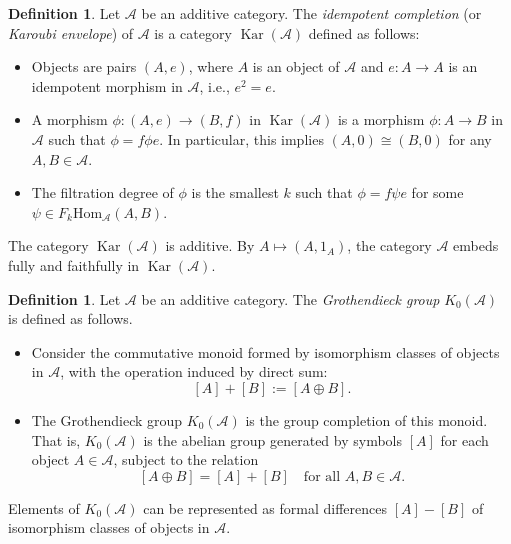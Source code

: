 \documentclass{article}
\theoremstyle{definition}
\newtheorem{defn}[theorem]{Definition}
\newcommand{\Hom}{\mathrm{Hom}}
\newcommand{\CA}{{ \mathcal A}}
\begin{document}
\begin{defn}
    Let $\mathcal{A}$ be an additive category. The \emph{idempotent completion} (or \emph{Karoubi envelope}) of $\mathcal{A}$ is a category $\operatorname{Kar}(\mathcal{A})$ defined as follows:

\begin{itemize}
    \item Objects are pairs $(A, e)$, where $A$ is an object of $\mathcal{A}$ and $e: A \to A$ is an idempotent morphism in $\mathcal{A}$, i.e., $e^2 = e$.
    
    \item A morphism $\phi: (A, e) \to (B, f)$ in $\operatorname{Kar}(\mathcal{A})$ is a morphism $\phi: A \to B$ in $\mathcal{A}$ such that $\phi = f   \phi   e$. In particular, this implies $(A, 0)\cong (B, 0)$ for any $A, B\in \CA.$
    
    \item The filtration degree of $\phi$ is the smallest $k$ such that $\phi=f \psi e$ for some $\psi \in F_k\Hom_\CA(A, B)$.
\end{itemize}

The category $\operatorname{Kar}(\mathcal{A})$ is additive. By $A\mapsto (A, 1_A)$, the category $\mathcal{A}$ embeds fully and faithfully in $\operatorname{Kar}(\mathcal{A})$.
\end{defn}

\begin{defn}


Let $\mathcal{A}$ be an additive category. The \emph{Grothendieck group} $K_0(\mathcal{A})$ is defined as follows.

\begin{itemize}
  \item Consider the commutative monoid formed by isomorphism classes of objects in $\mathcal{A}$, with the operation induced by direct sum:
  \[
  [A] + [B] := [A \oplus B].
  \]
  \item The Grothendieck group $K_0(\mathcal{A})$ is the group completion of this monoid. That is, $K_0(\mathcal{A})$ is the abelian group generated by symbols $[A]$ for each object $A \in \mathcal{A}$, subject to the relation
  \[
  [A \oplus B] = [A] + [B] \quad \text{for all } A, B \in \mathcal{A}.
  \]
\end{itemize}

Elements of $K_0(\mathcal{A})$ can be represented as formal differences $[A] - [B]$ of isomorphism classes of objects in $\mathcal{A}$.

\end{defn}
\end{document}
